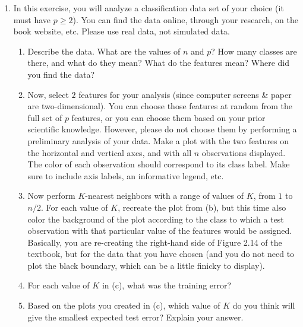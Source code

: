 \documentclass[12pt]{article}
\begin{document}
\begin{enumerate}
 \item In this exercise, you will analyze a classification data set of your choice (it must have $p \geq 2$). You can find the data online, through your research, on the book website, etc. Please use real data, not simulated data.
 \begin{enumerate}
 \item Describe the data. What are the values of $n$ and $p$? How many classes are there, and what do they mean? What do the features mean? Where did you find the data? 
 \item Now, select $2$ features for your analysis (since computer screens \& paper are two-dimensional). You can choose those features at random from the full set of $p$ features, or you can choose them based on your prior scientific knowledge.  However, please do not choose them by performing a preliminary analysis of your data. Make a plot with the two features on the horizontal and vertical axes, and with all $n$ observations displayed. The color of each observation should correspond to its class label. Make sure to include axis labels, an informative legend, etc.
 \item Now perform $K$-nearest neighbors with a range of values of $K$, from $1$ to $n/2$. For each value of $K$, recreate the plot from (b), but this time also color the background of the plot according to the class to which a test observation with that particular value of the features would be assigned. Basically, you are re-creating the right-hand side of Figure 2.14 of the textbook, but for the data that you have chosen (and you do not need to plot the black boundary, which can be a little finicky to display). 
 \item For each value of $K$ in (c), what was the  training error? 
 \item Based on the plots you created in (c), which value of $K$ do you think will give the smallest expected test error?  Explain your answer. 
 \end{enumerate}
 

\end{enumerate}
\end{document}
